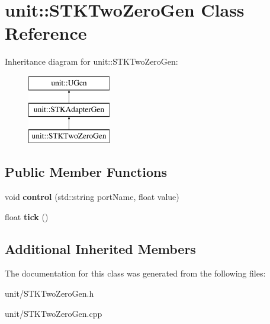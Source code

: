 \hypertarget{classunit_1_1STKTwoZeroGen}{}\section{unit\+:\+:S\+T\+K\+Two\+Zero\+Gen Class Reference}
\label{classunit_1_1STKTwoZeroGen}
Inheritance diagram for unit\+:\+:S\+T\+K\+Two\+Zero\+Gen\+:\begin{figure}[H]
\begin{center}
\leavevmode
\includegraphics[height=3.000000cm]{classunit_1_1STKTwoZeroGen}
\end{center}
\end{figure}
\subsection*{Public Member Functions}
\begin{DoxyCompactItemize}
\item 
void {\bfseries control} (std\+::string port\+Name, float value)\hypertarget{classunit_1_1STKTwoZeroGen_a35f0458e31142985a3f35b603ff90e62}{}\label{classunit_1_1STKTwoZeroGen_a35f0458e31142985a3f35b603ff90e62}

\item 
float {\bfseries tick} ()\hypertarget{classunit_1_1STKTwoZeroGen_a1e9392a2e8dc67862de802e914acbf33}{}\label{classunit_1_1STKTwoZeroGen_a1e9392a2e8dc67862de802e914acbf33}

\end{DoxyCompactItemize}
\subsection*{Additional Inherited Members}


The documentation for this class was generated from the following files\+:\begin{DoxyCompactItemize}
\item 
unit/S\+T\+K\+Two\+Zero\+Gen.\+h\item 
unit/S\+T\+K\+Two\+Zero\+Gen.\+cpp\end{DoxyCompactItemize}

